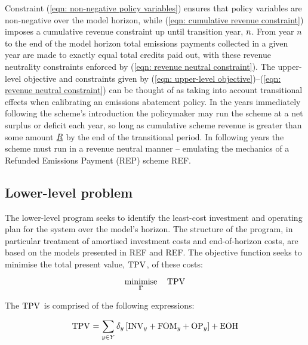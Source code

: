 \documentclass{article}
\DeclareMathOperator*{\minimise}{minimise}
\begin{document}
Constraint (\ref{eqn: non-negative policy variables}) ensures that policy variables are non-negative over the model horizon, while (\ref{eqn: cumulative revenue constraint}) imposes a cumulative revenue constraint up until transition year, $n$. From year $n$ to the end of the model horizon total emissions payments collected in a given year are made to exactly equal total credits paid out, with these revenue neutrality constraints enforced by (\ref{eqn: revenue neutral constraint}). The upper-level objective and constraints given by (\ref{eqn: upper-level objective})--(\ref{eqn: revenue neutral constraint}) can be thought of as taking into account transitional effects when calibrating an emissions abatement policy. In the years immediately following the scheme's introduction the policymaker may run the scheme at a net surplus or deficit each year, so long as cumulative scheme revenue is greater than some amount $\underline{R}$ by the end of the transitional period. In following years the scheme must run in a revenue neutral manner -- emulating the mechanics of a Refunded Emissions Payment (REP) scheme REF.

\subsection{Lower-level problem}
\label{subsec: lower-level problem}
The lower-level program seeks to identify the least-cost investment and operating plan for the system over the model's horizon. The structure of the program, in particular treatment of amortised investment costs and end-of-horizon costs, are based on the models presented in REF and REF. The objective function seeks to minimise the total present value, $\mathrm{TPV}_{}$, of these costs:

\begin{equation}
	\minimise\limits_{\bm{\Gamma}} \quad \cTotalPresentValue
\end{equation}

The $\mathrm{TPV}_{}$ is comprised of the following expressions:

\begin{align}
\begin{split}
\cTotalPresentValue & = \sum\limits_{\iYear \in \sYears} \cDiscountRate \left[\cInvestmentCost + \cFixedOperationsMaintenanceCost + \cOperatingCost[\iYear] \right] 
+ \cEndOfHorizonCost \\
\end{split}
\label{eqn: total present value expression}
\end{align}
\end{document}
